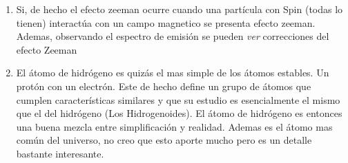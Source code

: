 \documentclass[12pt]{exam}
\begin{document}
\begin{enumerate}
\begin{enumerate}
      \item Si, de hecho el efecto zeeman ocurre cuando una partícula con Spin (todas lo tienen) interactúa con un campo magnetico se presenta efecto zeeman. Ademas, observando el espectro de emisión se pueden \textit{ver} correcciones del efecto Zeeman
      \item El átomo de hidrógeno es quizás el mas simple de los átomos estables. Un protón con un electrón. Este de hecho define un grupo de átomos que cumplen características similares y que su estudio es esencialmente el mismo que el del hidrógeno (Los Hidrogenoides). El átomo de hidrógeno es entonces una buena mezcla entre simplificación y realidad. Ademas es el átomo mas común del universo, no creo que esto aporte mucho pero es un detalle bastante interesante. 
    \end{enumerate}
\end{enumerate}
\end{document}
